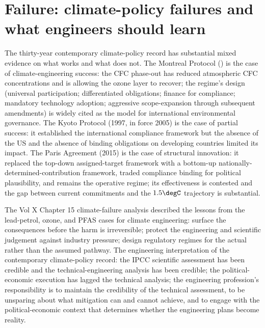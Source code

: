 \section{Failure: climate-policy failures and what engineers should learn}

The thirty-year contemporary climate-policy record has substantial mixed evidence on what works and what does not. The Montreal Protocol (\cite{law:montreal-protocol-1987}) is the case of climate-engineering success: the CFC phase-out has reduced atmospheric CFC concentrations and is allowing the ozone layer to recover; the regime's design (universal participation; differentiated obligations; finance for compliance; mandatory technology adoption; aggressive scope-expansion through subsequent amendments) is widely cited as the model for international environmental governance. The Kyoto Protocol (1997, in force 2005) is the case of partial success: it established the international compliance framework but the absence of the US and the absence of binding obligations on developing countries limited its impact. The Paris Agreement (2015) is the case of structural innovation: it replaced the top-down assigned-target framework with a bottom-up nationally-determined-contribution framework, traded compliance binding for political plausibility, and remains the operative regime; its effectiveness is contested and the gap between current commitments and the $1.5\degC$ trajectory is substantial.

The Vol X Chapter 15 climate-failure analysis described the lessons from the lead-petrol, ozone, and PFAS cases for climate engineering: surface the consequences before the harm is irreversible; protect the engineering and scientific judgement against industry pressure; design regulatory regimes for the actual rather than the assumed pathway. The engineering interpretation of the contemporary climate-policy record: the IPCC scientific assessment has been credible and the technical-engineering analysis has been credible; the political-economic execution has lagged the technical analysis; the engineering profession's responsibility is to maintain the credibility of the technical assessment, to be unsparing about what mitigation can and cannot achieve, and to engage with the political-economic context that determines whether the engineering plans become reality.

